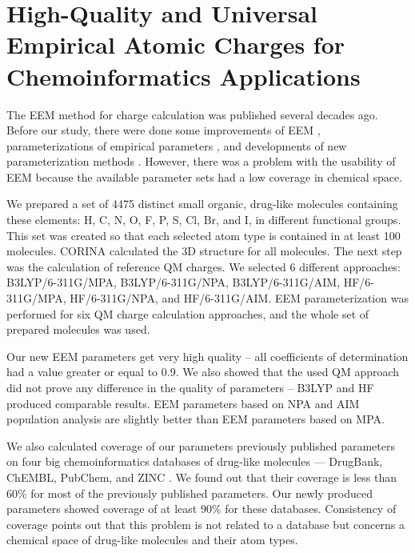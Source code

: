 \section{High-Quality and Universal Empirical Atomic Charges for
Chemoinformatics Applications} \label{sec:param-article}

The EEM method for charge calculation was published several decades ago.
Before our study, there were done some improvements of EEM \cite{Yang1997,
Chaves2006}, parameterizations of empirical parameters \cite{Mortier1986, Baekelandt1991, 
Bultinck2002, Bultinck2004, Chaves2006, Svobodova2007, Jirouskova2009, Ouyang2009},
and developments of new parameterization methods \cite{Svobodova2007, Bultinck2002, Chaves2006}.
However, there was a problem with the usability of EEM because the available
parameter sets had a low coverage in chemical space.    

We prepared a set of 4475 distinct small organic, drug-like molecules containing
these elements: H, C, N, O, F, P, S, Cl, Br, and I, in different functional
groups. This set was created so that each selected atom type is contained
in at least 100 molecules. CORINA calculated the 3D structure for all molecules.
The next step was the calculation of reference QM charges. We selected
6 different approaches: B3LYP/6-311G/MPA, B3LYP/6-311G/NPA, B3LYP/6-311G/AIM,
HF/6-311G/MPA, HF/6-311G/NPA, and HF/6-311G/AIM. EEM parameterization was
performed for six QM charge calculation approaches, and the whole
set of prepared molecules was used.

Our new EEM parameters get very high quality -- all coefficients of determination had
a value greater or equal to 0.9. We also showed that the used QM approach did
not prove any difference in the quality of parameters -- B3LYP and HF produced
comparable results. EEM parameters based on NPA and AIM population analysis are
slightly better than EEM parameters based on MPA.

 We also calculated coverage of our parameters previously published parameters
 on four big chemoinformatics databases of drug-like molecules — DrugBank, \cite{Law2014}
 ChEMBL, \cite{Bento2013} PubChem, \cite{pubchem} and ZINC \cite{Irwin2012}.
 We found out that their coverage is less than 60\%
 for most of the previously published parameters.  Our newly produced parameters
 showed coverage of at least 90\% for these databases. Consistency of coverage
 points out that this problem is not related to a database but concerns
 a chemical space of drug-like molecules and their atom types.


